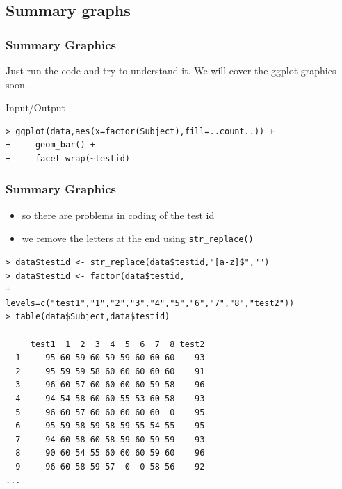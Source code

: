 \documentclass[xcolor={table},c]{beamer}
\begin{document}
\subsection{Summary graphs}
\begin{frame}[fragile]\frametitle{Summary Graphics}
Just run the code and try to understand it. We will cover the ggplot graphics soon.
\begin{exampleblock}{Input/Output}\tiny
\begin{verbatim}
> ggplot(data,aes(x=factor(Subject),fill=..count..)) +
+     geom_bar() +
+     facet_wrap(~testid)
\end{verbatim}
    \end{exampleblock}
\begin{center}
\end{center}
\end{frame}

\begin{frame}[fragile]\frametitle{Summary Graphics}
  \begin{itemize}
  \item so there are problems in coding of the test id
  \item we remove the letters at the end using \texttt{str\_replace()}
  \end{itemize}\footnotesize
\begin{verbatim}
> data$testid <- str_replace(data$testid,"[a-z]$","")
> data$testid <- factor(data$testid,
+                       levels=c("test1","1","2","3","4","5","6","7","8","test2"))
> table(data$Subject,data$testid)
    
     test1  1  2  3  4  5  6  7  8 test2
  1     95 60 59 60 59 59 60 60 60    93
  2     95 59 59 58 60 60 60 60 60    91
  3     96 60 57 60 60 60 60 59 58    96
  4     94 54 58 60 60 55 53 60 58    93
  5     96 60 57 60 60 60 60 60  0    95
  6     95 59 58 59 58 59 55 54 55    95
  7     94 60 58 60 58 59 60 59 59    93
  8     90 60 54 55 60 60 60 59 60    96
  9     96 60 58 59 57  0  0 58 56    92
...
\end{verbatim}
\end{frame}
\end{document}
